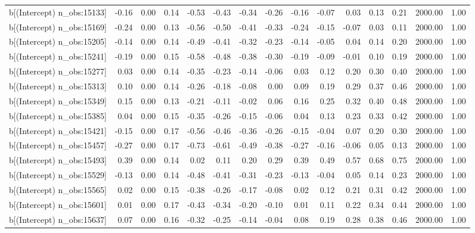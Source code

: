 \begin{table}[ht]
\begin{tabular}{rrrrrrrrrrrrrrr}
  b[(Intercept) n\_obs:15133] & -0.16 & 0.00 & 0.14 & -0.53 & -0.43 & -0.34 & -0.26 & -0.16 & -0.07 & 0.03 & 0.13 & 0.21 & 2000.00 & 1.00 \\ 
  b[(Intercept) n\_obs:15169] & -0.24 & 0.00 & 0.13 & -0.56 & -0.50 & -0.41 & -0.33 & -0.24 & -0.15 & -0.07 & 0.03 & 0.11 & 2000.00 & 1.00 \\ 
  b[(Intercept) n\_obs:15205] & -0.14 & 0.00 & 0.14 & -0.49 & -0.41 & -0.32 & -0.23 & -0.14 & -0.05 & 0.04 & 0.14 & 0.20 & 2000.00 & 1.00 \\ 
  b[(Intercept) n\_obs:15241] & -0.19 & 0.00 & 0.15 & -0.58 & -0.48 & -0.38 & -0.30 & -0.19 & -0.09 & -0.01 & 0.10 & 0.19 & 2000.00 & 1.00 \\ 
  b[(Intercept) n\_obs:15277] & 0.03 & 0.00 & 0.14 & -0.35 & -0.23 & -0.14 & -0.06 & 0.03 & 0.12 & 0.20 & 0.30 & 0.40 & 2000.00 & 1.00 \\ 
  b[(Intercept) n\_obs:15313] & 0.10 & 0.00 & 0.14 & -0.26 & -0.18 & -0.08 & 0.00 & 0.09 & 0.19 & 0.29 & 0.37 & 0.46 & 2000.00 & 1.00 \\ 
  b[(Intercept) n\_obs:15349] & 0.15 & 0.00 & 0.13 & -0.21 & -0.11 & -0.02 & 0.06 & 0.16 & 0.25 & 0.32 & 0.40 & 0.48 & 2000.00 & 1.00 \\ 
  b[(Intercept) n\_obs:15385] & 0.04 & 0.00 & 0.15 & -0.35 & -0.26 & -0.15 & -0.06 & 0.04 & 0.13 & 0.23 & 0.33 & 0.42 & 2000.00 & 1.00 \\ 
  b[(Intercept) n\_obs:15421] & -0.15 & 0.00 & 0.17 & -0.56 & -0.46 & -0.36 & -0.26 & -0.15 & -0.04 & 0.07 & 0.20 & 0.30 & 2000.00 & 1.00 \\ 
  b[(Intercept) n\_obs:15457] & -0.27 & 0.00 & 0.17 & -0.73 & -0.61 & -0.49 & -0.38 & -0.27 & -0.16 & -0.06 & 0.05 & 0.13 & 2000.00 & 1.00 \\ 
  b[(Intercept) n\_obs:15493] & 0.39 & 0.00 & 0.14 & 0.02 & 0.11 & 0.20 & 0.29 & 0.39 & 0.49 & 0.57 & 0.68 & 0.75 & 2000.00 & 1.00 \\ 
  b[(Intercept) n\_obs:15529] & -0.13 & 0.00 & 0.14 & -0.48 & -0.41 & -0.31 & -0.23 & -0.13 & -0.04 & 0.05 & 0.14 & 0.23 & 2000.00 & 1.00 \\ 
  b[(Intercept) n\_obs:15565] & 0.02 & 0.00 & 0.15 & -0.38 & -0.26 & -0.17 & -0.08 & 0.02 & 0.12 & 0.21 & 0.31 & 0.42 & 2000.00 & 1.00 \\ 
  b[(Intercept) n\_obs:15601] & 0.01 & 0.00 & 0.17 & -0.43 & -0.34 & -0.20 & -0.10 & 0.01 & 0.11 & 0.22 & 0.34 & 0.44 & 2000.00 & 1.00 \\ 
  b[(Intercept) n\_obs:15637] & 0.07 & 0.00 & 0.16 & -0.32 & -0.25 & -0.14 & -0.04 & 0.08 & 0.19 & 0.28 & 0.38 & 0.46 & 2000.00 & 1.00 \\ 

\end{tabular}
\end{table}
